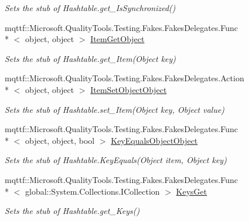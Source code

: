 \begin{DoxyCompactItemize}
\begin{DoxyCompactList}\small\item\em Sets the stub of Hashtable.\-get\-\_\-\-Is\-Synchronized()\end{DoxyCompactList}\item 
mqttf\-::\-Microsoft.\-Quality\-Tools.\-Testing.\-Fakes.\-Fakes\-Delegates.\-Func\\*
$<$ object, object $>$ \hyperlink{class_system_1_1_configuration_1_1_fakes_1_1_stub_settings_context_ab3a9d1ebf2fe1d2daa3fe970bbb20f65}{Item\-Get\-Object}
\begin{DoxyCompactList}\small\item\em Sets the stub of Hashtable.\-get\-\_\-\-Item(\-Object key)\end{DoxyCompactList}\item 
mqttf\-::\-Microsoft.\-Quality\-Tools.\-Testing.\-Fakes.\-Fakes\-Delegates.\-Action\\*
$<$ object, object $>$ \hyperlink{class_system_1_1_configuration_1_1_fakes_1_1_stub_settings_context_af016382aca684ad44635bd83e73fde36}{Item\-Set\-Object\-Object}
\begin{DoxyCompactList}\small\item\em Sets the stub of Hashtable.\-set\-\_\-\-Item(\-Object key, Object value)\end{DoxyCompactList}\item 
mqttf\-::\-Microsoft.\-Quality\-Tools.\-Testing.\-Fakes.\-Fakes\-Delegates.\-Func\\*
$<$ object, object, bool $>$ \hyperlink{class_system_1_1_configuration_1_1_fakes_1_1_stub_settings_context_af8143bd177a31008aef986e20c990121}{Key\-Equals\-Object\-Object}
\begin{DoxyCompactList}\small\item\em Sets the stub of Hashtable.\-Key\-Equals(\-Object item, Object key)\end{DoxyCompactList}\item 
mqttf\-::\-Microsoft.\-Quality\-Tools.\-Testing.\-Fakes.\-Fakes\-Delegates.\-Func\\*
$<$ global\-::\-System.\-Collections.\-I\-Collection $>$ \hyperlink{class_system_1_1_configuration_1_1_fakes_1_1_stub_settings_context_a8e28be62e338379bf2663bbb4d852a60}{Keys\-Get}
\begin{DoxyCompactList}\small\item\em Sets the stub of Hashtable.\-get\-\_\-\-Keys()\end{DoxyCompactList}\item 

\end{DoxyCompactItemize}
